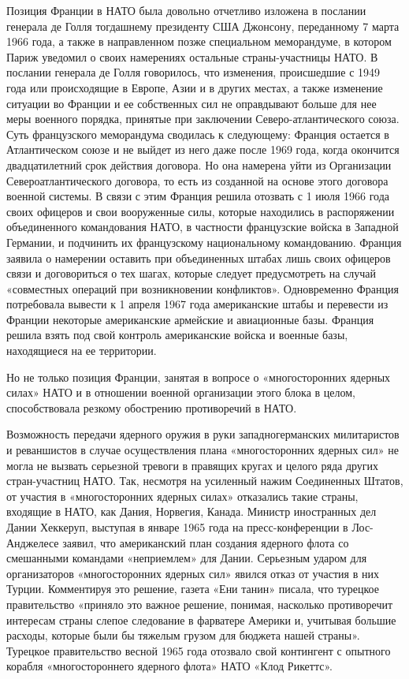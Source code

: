 \documentclass[12pt, a4paper, openany]{book}
\begin{document}
		Позиция Франции в НАТО была довольно отчетливо изложена в послании генерала де Голля тогдашнему президенту США Джонсону, переданному 7 марта 1966 года, а также в направленном позже специальном меморандуме, в котором Париж уведомил о своих намерениях остальные страны-участницы НАТО. В послании генерала де Голля говорилось, что изменения, происшедшие с 1949 года или происходящие в Европе, Азии и в других местах, а также изменение ситуации во Франции и ее собственных сил не оправдывают больше для нее меры военного порядка, принятые при заключении Северо-атлантического союза. Суть французского меморандума сводилась к следующему: Франция остается в Атлантическом союзе и не выйдет из него даже после 1969 года, когда окончится двадцатилетний срок действия договора. Но она намерена уйти из Организации Североатлантического договора, то есть из созданной на основе этого договора военной системы. В связи с этим Франция решила отозвать с 1 июля 1966 года своих офицеров и свои вооруженные силы, которые находились в распоряжении объединенного командования НАТО, в частности французские войска в Западной Германии, и подчинить их французскому национальному командованию. Франция заявила о намерении оставить при объединенных штабах лишь своих офицеров связи и договориться о тех шагах, которые следует предусмотреть на случай «совместных операций при возникновении конфликтов». Одновременно Франция потребовала вывести к 1 апреля 1967 года американские штабы и перевести из Франции некоторые американские армейские и авиационные базы. Франция решила взять под свой контроль американские войска и военные базы, находящиеся на ее территории.
		
		Но не только позиция Франции, занятая в вопросе о «многосторонних ядерных силах» НАТО и в отношении военной организации этого блока в целом, способствовала резкому обострению противоречий в НАТО.
		
		Возможность передачи ядерного оружия в руки западногерманских милитаристов и реваншистов в случае осуществления плана «многосторонних ядерных сил» не могла не вызвать серьезной тревоги в правящих кругах и целого ряда других стран-участниц НАТО. Так, несмотря на усиленный нажим Соединенных Штатов, от участия в «многосторонних ядерных силах» отказались такие страны, входящие в НАТО, как Дания, Норвегия, Канада. Министр иностранных дел Дании Хеккеруп, выступая в январе 1965 года на пресс-конференции в Лос-Анджелесе заявил, что американский план создания ядерного флота со смешанными командами «неприемлем» для Дании. Серьезным ударом для организаторов «многосторонних ядерных сил» явился отказ от участия в них Турции. Комментируя это решение, газета «Ени танин» писала, что турецкое правительство «приняло это важное решение, понимая, насколько противоречит интересам страны слепое следование в фарватере Америки и, учитывая большие расходы, которые были бы тяжелым грузом для бюджета нашей страны». Турецкое правительство весной 1965 года отозвало свой контингент с опытного корабля «многостороннего ядерного флота» НАТО «Клод Рикеттс».
		
\end{document}
